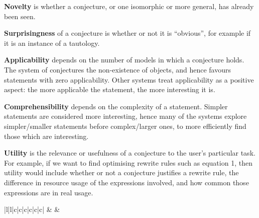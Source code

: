 {\bf Novelty} is whether a conjecture, or one isomorphic or more
general, has already been seen.

{\bf Surprisingness} of a conjecture is whether or not it is
``obvious'', for example if it is an instance of a tautology.

{\bf Applicability} depends on the number of models in which a
conjecture holds. The system of \Bagai{} conjectures the non-existence of
objects, and hence favours statements with zero applicability. Other systems
treat applicability as a positive aspect: the more applicable the statement, the
more interesting it is.

{\bf Comprehensibility} depends on the complexity of a statement. Simpler
statements are considered more interesting, hence many of the systems explore
simpler/smaller statements before complex/larger ones, to more efficiently find
those which are interesting.

{\bf Utility} is the relevance or usefulness of a conjecture to the
user's particular task. For example, if we want to find optimising
rewrite rules such as equation 1, then utility would include whether
or not a conjecture justifies a rewrite rule, the difference in
resource usage of the expressions involved, and how common those
expressions are in real usage.


\begin{table}
  \centering
  \begin{tabular}{ |l|l|c|c|c|c|c|c| }
    \hline
                         &
                &
     \\ \hhline{~~------}
    \tRow{          &                    & \iE & \iN & \iS & \iA & \iC & \iU}
  \end{tabular}
  \caption{Classification of MTE systems from~\cite{colton2000notion}, extended
    to include those from~\cite{claessen2013automating} (QuickSpec is the
    conjecture generation component of HipSpec) and the similar Speculate
    system~\cite{braquehais2017speculate}. The interestingness measures are
    \iE{}mpirical plausibility, \iN{}ovelty, \iS{}urprisingness,
    \iA{}pplicability, \iC{}omprehensibility (low complexity) and \iU{}tility.}
  \label{table:colton}
\end{table}

